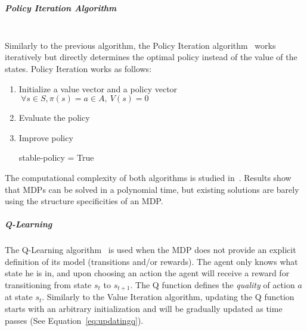 \textbf{\\}
\subparagraph{Policy Iteration Algorithm}\textbf{\\}
Similarly to the previous algorithm, the Policy Iteration algorithm~\cite{policyiteration} works iteratively but directly determines the optimal policy instead of the value of the states.
Policy Iteration works as follows:
\begin{enumerate}
    \item Initialize a value vector and a policy vector $~\forall s\in S,\pi(s)=a\in A,~V(s)=0$
    \item Evaluate the policy
        \begin{algorithm}
        \end{algorithm}
    \item Improve policy
    \begin{algorithm}
        stable-policy = True
    \end{algorithm}
\end{enumerate}



The computational complexity of both algorithms is studied in~\cite{mdpcomplexity}.
Results show that MDPs can be solved in a polynomial time, but existing solutions are barely using the structure specificities of an MDP.

\subparagraph{Q-Learning}
The Q-Learning algorithm~\cite{qlearning} is used when the MDP does not provide an explicit definition of its model (\ie transitions and/or rewards).
The agent only knows what state he is in, and upon choosing an action the agent will receive a reward for transitioning from state $s_t$ to $s_{t+1}$.
The Q function defines the \textit{quality} of action $a$ at state $s_t$.
Similarly to the Value Iteration algorithm, updating the Q function starts with an arbitrary initialization and will be gradually updated as time passes (See Equation~\eqref{eq:updatingq}).

